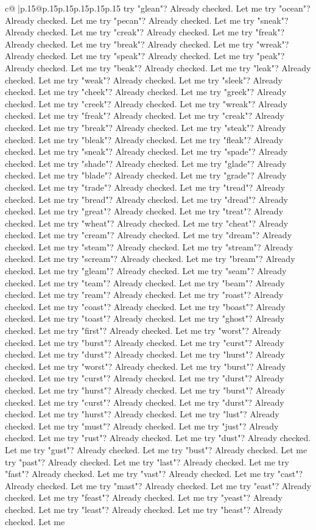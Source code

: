 \documentclass{article}
\begin{document}
{\begin{supertabular}{c@{$\;$}|p{.15\linewidth}@{}p{.15\linewidth}p{.15\linewidth}p{.15\linewidth}p{.15\linewidth}p{.15\linewidth}}
{{{try "glean"? Already checked. Let me try "ocean"? Already checked. Let me try "pecan"? Already checked. Let me try "sneak"? Already checked. Let me try "creak"? Already checked. Let me try "freak"? Already checked. Let me try "break"? Already checked. Let me try "wreak"? Already checked. Let me try "speak"? Already checked. Let me try "peak"? Already checked. Let me try "beak"? Already checked. Let me try "leak"? Already checked. Let me try "weak"? Already checked. Let me try "sleek"? Already checked. Let me try "cheek"? Already checked. Let me try "greek"? Already checked. Let me try "creek"? Already checked. Let me try "wreak"? Already checked. Let me try "freak"? Already checked. Let me try "creak"? Already checked. Let me try "break"? Already checked. Let me try "steak"? Already checked. Let me try "bleak"? Already checked. Let me try "fleak"? Already checked. Let me try "sneak"? Already checked. Let me try "spade"? Already checked. Let me try "shade"? Already checked. Let me try "glade"? Already checked. Let me try "blade"? Already checked. Let me try "grade"? Already checked. Let me try "trade"? Already checked. Let me try "tread"? Already checked. Let me try "bread"? Already checked. Let me try "dread"? Already checked. Let me try "great"? Already checked. Let me try "treat"? Already checked. Let me try "wheat"? Already checked. Let me try "cheat"? Already checked. Let me try "cream"? Already checked. Let me try "dream"? Already checked. Let me try "steam"? Already checked. Let me try "stream"? Already checked. Let me try "scream"? Already checked. Let me try "bream"? Already checked. Let me try "gleam"? Already checked. Let me try "seam"? Already checked. Let me try "team"? Already checked. Let me try "beam"? Already checked. Let me try "ream"? Already checked. Let me try "roast"? Already checked. Let me try "coast"? Already checked. Let me try "boast"? Already checked. Let me try "toast"? Already checked. Let me try "ghost"? Already checked. Let me try "first"? Already checked. Let me try "worst"? Already checked. Let me try "burst"? Already checked. Let me try "curst"? Already checked. Let me try "durst"? Already checked. Let me try "hurst"? Already checked. Let me try "worst"? Already checked. Let me try "burst"? Already checked. Let me try "curst"? Already checked. Let me try "durst"? Already checked. Let me try "hurst"? Already checked. Let me try "burst"? Already checked. Let me try "curst"? Already checked. Let me try "durst"? Already checked. Let me try "hurst"? Already checked. Let me try "lust"? Already checked. Let me try "must"? Already checked. Let me try "just"? Already checked. Let me try "rust"? Already checked. Let me try "dust"? Already checked. Let me try "gust"? Already checked. Let me try "bust"? Already checked. Let me try "past"? Already checked. Let me try "last"? Already checked. Let me try "fast"? Already checked. Let me try "vast"? Already checked. Let me try "cast"? Already checked. Let me try "mast"? Already checked. Let me try "east"? Already checked. Let me try "feast"? Already checked. Let me try "yeast"? Already checked. Let me try "least"? Already checked. Let me try "heast"? Already checked. Let me }}}
\end{supertabular}}
\end{document}
